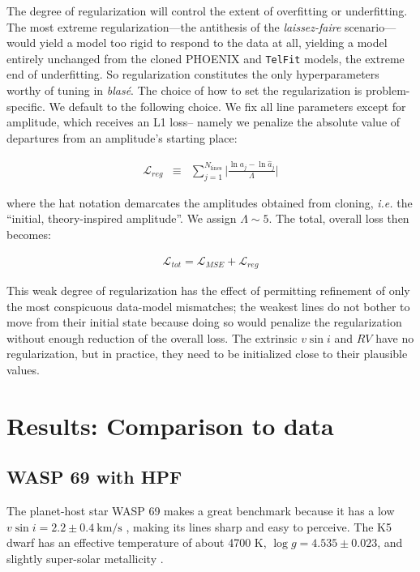 \documentclass[trackchanges]{aastex631}
\begin{document}
The degree of regularization will control the extent of overfitting or underfitting. The most extreme regularization---the antithesis of the \emph{laissez-faire} scenario---would yield a model too rigid to respond to the data at all, yielding a model entirely unchanged from the cloned PHOENIX and \texttt{TelFit} models, the extreme end of underfitting.  So regularization constitutes the only hyperparameters worthy of tuning in \emph{blas\'e}.  The choice of how to set the regularization is problem-specific.  We default to the following choice. We fix all line parameters except for amplitude, which receives an L1 loss-- namely we penalize the absolute value of departures from an amplitude's starting place:

\begin{eqnarray}
    \mathcal{L}_{reg} &\equiv& \sum_{j=1}^{N_\mathrm{lines}} \Big|\frac{\ln{a_j} - \ln{\hat{a}_j}}{\Lambda}\Big|
\end{eqnarray}

\noindent where the hat notation demarcates the amplitudes obtained from cloning, \emph{i.e.} the ``initial, theory-inspired amplitude''.  We assign $\Lambda\sim5$.  The total, overall loss then becomes:

\begin{eqnarray}
    \mathcal{L}_{tot} = \mathcal{L}_{MSE} + \mathcal{L}_{reg}
\end{eqnarray}

This weak degree of regularization has the effect of permitting refinement of only the most conspicuous data-model mismatches; the weakest lines do not bother to move from their initial state because doing so would penalize the regularization without enough reduction of the overall loss.  The extrinsic $v\sin{i}$ and $RV$ have no regularization, but in practice, they need to be initialized close to their plausible values.

\section{Results: Comparison to data}\label{secResults}
\subsection{WASP 69 with HPF}

The planet-host star WASP 69 makes a great benchmark because it has a low $v\sin{i}=2.2\pm0.4~\text{km/s}$ \citep{2017A&A...608A.135C}, making its lines sharp and easy to perceive.  The K5 dwarf has an effective temperature of about 4700 K, $\log{g}=4.535\pm0.023$, and slightly super-solar metallicity \citep{2014MNRAS.445.1114A}.
\end{document}
